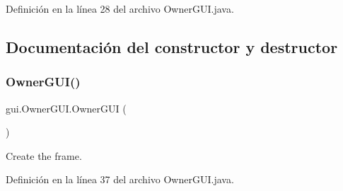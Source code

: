 Definición en la línea 28 del archivo Owner\+G\+U\+I.\+java.



\subsection{Documentación del constructor y destructor}
\mbox{\label{classgui_1_1_owner_g_u_i_ae4efc071e5f519db154b9fc128239e89}} 
\subsubsection{\texorpdfstring{OwnerGUI()}{OwnerGUI()}}
{\footnotesize\ttfamily gui.\+Owner\+G\+U\+I.\+Owner\+G\+UI (\begin{DoxyParamCaption}{ }\end{DoxyParamCaption})}



Create the frame. 



Definición en la línea 37 del archivo Owner\+G\+U\+I.\+java.


